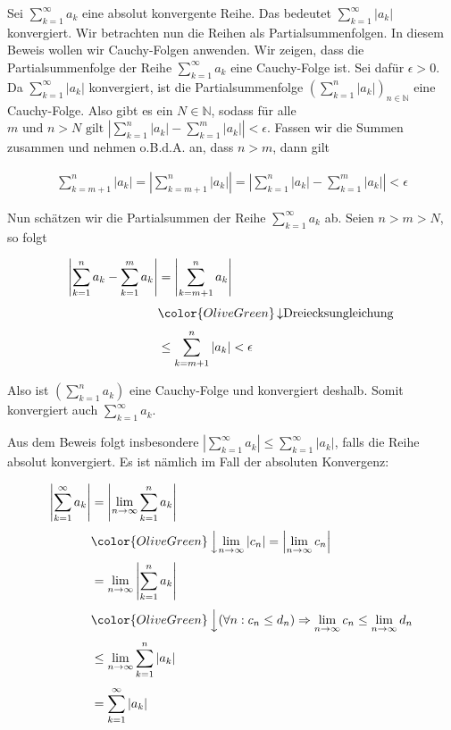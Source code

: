 \documentclass[fontsize=9pt,
               parskip=half-,
               DIV=14,
               listof=chapterentry,
               tocflat]{scrbook}
\begin{document}
\begin{proof*}
Sei $\sum _{k=1}^{\infty }a_{k}$ eine absolut konvergente Reihe. Das bedeutet $\sum _{k=1}^{\infty }|a_{k}|$ konvergiert. Wir betrachten nun die Reihen als Partialsummenfolgen. In diesem Beweis wollen wir Cauchy-Folgen anwenden. Wir zeigen, dass die Partialsummenfolge der Reihe $\sum _{k=1}^{\infty }a_{k}$ eine Cauchy-Folge ist. Sei dafür $\epsilon >0$. Da $\sum _{k=1}^{\infty }|a_{k}|$ konvergiert, ist die Partialsummenfolge $\left(\sum _{k=1}^{n}|a_{k}|\right)_{n\in \mathbb {N} }$ eine Cauchy-Folge. Also gibt es ein $N\in \mathbb {N} $, sodass für alle $m{\text{ und }}n>N{\text{ gilt }}\left|\sum _{k=1}^{n}|a_{k}|-\sum _{k=1}^{m}|a_{k}|\right|<\epsilon $. Fassen wir die Summen zusammen und nehmen o.B.d.A. an, dass $n>m$, dann gilt

\begin{align*}
\sum _{k=m+1}^{n}|a_{k}|=\left|\sum _{k=m+1}^{n}|a_{k}|\right|=\left|\sum _{k=1}^{n}|a_{k}|-\sum _{k=1}^{m}|a_{k}|\right|<\epsilon 
\end{align*}

Nun schätzen wir die Partialsummen der Reihe $\sum _{k=1}^{\infty }a_{k}$ ab. Seien $n>m>N$, so folgt

\begin{align*}
\left|\sum _{k=1}^{n}a_{k}-\sum _{k=1}^{m}a_{k}\right|&=\left|\sum _{k=m+1}^{n}a_{k}\right|\\[0.3em]&{\color {OliveGreen}\left\downarrow {\text{Dreiecksungleichung}}\right.}\\[0.3em]&\leq \sum _{k=m+1}^{n}|a_{k}|<\epsilon 
\end{align*}

Also ist $\left(\sum _{k=1}^{n}a_{k}\right)$ eine Cauchy-Folge und konvergiert deshalb. Somit konvergiert auch $\sum _{k=1}^{\infty }a_{k}$.

\end{proof*}

\begin{hint*}
Aus dem Beweis folgt insbesondere $\left|\sum _{k=1}^{\infty }a_{k}\right|\leq \sum _{k=1}^{\infty }|a_{k}|$, falls die Reihe absolut konvergiert. Es ist nämlich im Fall der absoluten Konvergenz:

\begin{align*}
\left|\sum _{k=1}^{\infty }a_{k}\right|&=\left|\lim _{n\to \infty }\sum _{k=1}^{n}a_{k}\right|\\[0.3em]&{\color {OliveGreen}\left\downarrow \lim _{n\to \infty }|c_{n}|=\left|\lim _{n\to \infty }c_{n}\right|\right.}\\[0.3em]&=\lim _{n\to \infty }\left|\sum _{k=1}^{n}a_{k}\right|\\[0.3em]&{\color {OliveGreen}\left\downarrow (\forall n:c_{n}\leq d_{n})\Rightarrow \lim _{n\to \infty }c_{n}\leq \lim _{n\to \infty }d_{n}\right.}\\[0.3em]&\leq \lim _{n\to \infty }\sum _{k=1}^{n}|a_{k}|\\[0.3em]&=\sum _{k=1}^{\infty }|a_{k}|
\end{align*}

\end{hint*}
\end{document}
